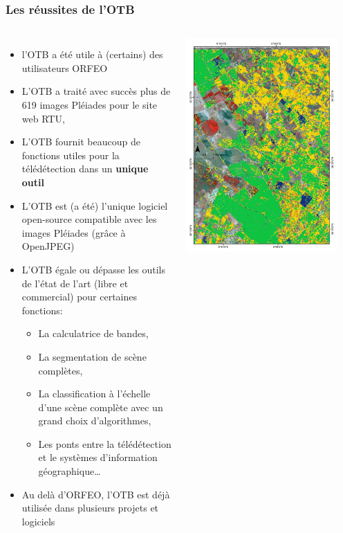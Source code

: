 \documentclass[8pt]{beamer}
\begin{document}
\begin{frame}
\frametitle{Les réussites de l'OTB}
\vspace{-0.5cm}
\begin{columns}
\begin{itemize}
\item l'OTB a été utile à (certains) des utilisateurs ORFEO
\item L'OTB a traité avec succès plus de 619 images Pléiades pour le site web RTU,
\item L'OTB fournit beaucoup de fonctions utiles pour la télédétection dans un \textbf{unique outil}
\item L'OTB est (a été) l'unique logiciel open-source compatible avec les images Pléiades (grâce à OpenJPEG)
\item L'OTB égale ou dépasse les outils de l'état de l'art (libre et commercial) pour certaines fonctions:
\begin{itemize}
\item La calculatrice de bandes,
\item La segmentation de scène complètes,
\item La classification à l'échelle d'une scène complète avec un grand choix d'algorithmes,
\item Les ponts entre la télédétection et le systèmes d'information géographique\ldots
\end{itemize}
\item Au delà d'ORFEO, l'OTB est déjà utilisée dans plusieurs projets et logiciels
\end{itemize}
\includegraphics[width=0.9\textwidth]{images/resultats_ird.png}\\

\end{columns}
\end{frame}
\end{document}
